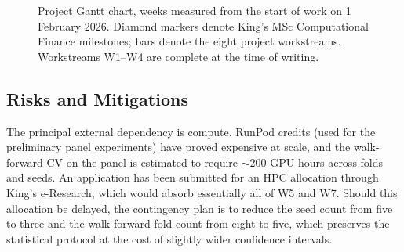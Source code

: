 \documentclass[11pt,a4paper]{article}
\begin{document}
\begin{figure}[h]
\centering
{}
\caption{Project Gantt chart, weeks measured from the start of work on
1 February 2026. Diamond markers denote King's MSc Computational Finance
milestones; bars denote the eight project workstreams. Workstreams W1--W4
are complete at the time of writing.}
\label{fig:gantt}
\end{figure}

\subsection{Risks and Mitigations}
The principal external dependency is compute. RunPod credits (used for the
preliminary panel experiments) have proved expensive at scale, and the
walk-forward CV on the panel is estimated to require $\sim$200 GPU-hours
across folds and seeds. An application has been submitted for an HPC
allocation through King's e-Research, which would absorb essentially all of
W5 and W7. Should this allocation be delayed, the contingency plan is to
reduce the seed count from five to three and the walk-forward fold count
from eight to five, which preserves the statistical protocol at the cost of
slightly wider confidence intervals.
\end{document}
